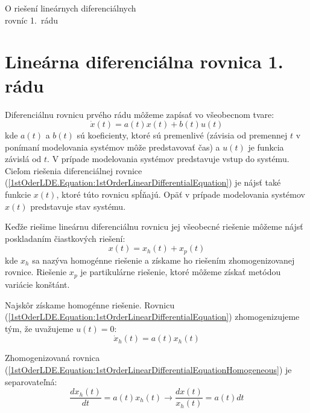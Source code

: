 \documentclass[a4paper, 10pt, ]{article}
\newcommand{\der}[2]{\frac{d #1}{d #2}}
\theoremstyle{definition}
\begin{document}
\begin{flushleft}
	O riešení lineárnych diferenciálnych \\ rovníc 1.~rádu
\end{flushleft}

\bigskip

\normalsize
\normalfont



\section{Lineárna diferenciálna rovnica 1. rádu}

Diferenciálnu rovnicu prvého rádu môžeme zapísať vo všeobecnom tvare:
\begin{equation}
    \label{1stOderLDE.Equation:1stOrderLinearDifferentialEquation}
    \dot{x}(t) = a(t) x(t) + b(t) u(t)
\end{equation}
kde $a(t)$ a $b(t)$ sú koeficienty, ktoré sú premenlivé (závisia od premennej $t$ v ponímaní modelovania systémov môže predstavovať čas) a $u(t)$ je funkcia závislá od $t$. V prípade modelovania systémov predstavuje vstup do systému. Cieľom riešenia diferenciálnej rovnice (\ref{1stOderLDE.Equation:1stOrderLinearDifferentialEquation}) je nájsť také funkcie $x(t)$, ktoré túto rovnicu spĺňajú. Opäť v prípade modelovania systémov $x(t)$ predstavuje stav systému.

Keďže riešime lineárnu diferenciálnu rovnicu jej všeobecné riešenie môžeme nájsť poskladaním čiastkových riešení:
\begin{equation}
    \label{1stOderLDE.Equation:SolutionLinearCombination}
    x(t) = x_h(t) + x_p(t)
\end{equation}
kde $x_h$ sa nazýva homogénne riešenie a získame ho riešením zhomogenizovanej rovnice. Riešenie $x_p$ je partikulárne riešenie, ktoré môžeme získať metódou variácie konštánt.

Najskôr získame homogénne riešenie. Rovnicu (\ref{1stOderLDE.Equation:1stOrderLinearDifferentialEquation}) zhomogenizujeme tým, že uvažujeme $u(t) = 0$:
\begin{equation}
    \label{1stOderLDE.Equation:1stOrderLinearDifferentialEquationHomogeneous}
    \dot{x}_h(t) = a(t) x_h(t)
\end{equation}

\noindent Zhomogenizovaná rovnica (\ref{1stOderLDE.Equation:1stOrderLinearDifferentialEquationHomogeneous}) je separovateľná:
\begin{equation}
    \label{1stOderLDE.Equation:1stOrderLinearDifferentialEquationHomogeneousSeparated}
    \der{x_h(t)}{t} = a(t) x_h(t) \longrightarrow \frac{dx(t)}{x_h(t)} = a(t)dt
\end{equation}
\end{document}
